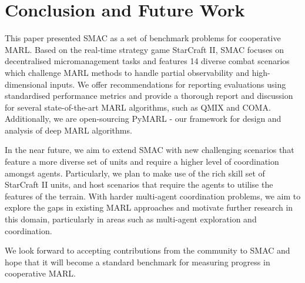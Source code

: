\section{Conclusion and Future Work}
This paper presented SMAC as a set of benchmark problems for cooperative MARL.
Based on the real-time strategy game StarCraft II, SMAC focuses on decentralised
micromanagement tasks and features 14 diverse combat scenarios which challenge
MARL methods to handle partial observability and high-dimensional inputs. We
offer recommendations for reporting evaluations using standardised performance
metrics and provide a thorough report and discussion for several
state-of-the-art MARL algorithms, such as QMIX and COMA. Additionally, we are
open-sourcing PyMARL - our framework for design and analysis of deep MARL
algorithms.

In the near future, we aim to extend SMAC with new challenging scenarios that
feature a more diverse set of units and require a higher level of coordination
amongst agents. Particularly, we plan to make use of the rich skill set of
StarCraft II units, and host scenarios that require the agents to utilise the
features of the terrain. With harder multi-agent coordination problems, we aim to explore the
gaps in existing MARL approaches and motivate further research in this domain,
particularly in areas such as multi-agent exploration and coordination.

We look forward to accepting contributions from the community to SMAC and hope
that it will become a standard benchmark for measuring progress in cooperative
MARL.

